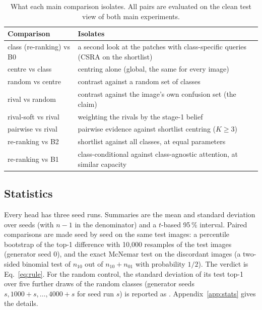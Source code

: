 \documentclass[11pt,a4paper]{article}
\theoremstyle{plain}
\newcommand{\fn}[1]{\texttt{\detokenize{#1}}}
\begin{document}
\begin{table}[!htbp]
\centering
\caption{What each main comparison isolates. All pairs are evaluated on the clean test view of both main
experiments.}
\label{tab:isolates}
\small
\begin{tabularx}{\textwidth}{@{}L{4.6cm}Y@{}}
\toprule
Comparison & Isolates\\
\midrule
class (re-ranking) vs B0 & a second look at the patches with class-specific queries (CSRA on the shortlist)\\
centre vs class & centring alone (global, the same for every image)\\
random vs centre & contrast against a random set of classes\\
rival vs random & contrast against the image's own confusion set (the claim)\\
rival-soft vs rival & weighting the rivals by the stage-1 belief\\
pairwise vs rival & pairwise evidence against shortlist centring ($K\ge3$)\\
re-ranking vs B2 & shortlist against all classes, at equal parameters\\
re-ranking vs B1 & class-conditional against class-agnostic attention, at similar capacity\\
\bottomrule
\end{tabularx}
\end{table}

\subsection{Statistics}\label{sec:stats}
Every head has three seed runs. Summaries are the mean and standard deviation over seeds (with $n-1$ in the
denominator) and a $t$-based 95\,\% interval. Paired comparisons are made seed by seed on the same test images: a
percentile bootstrap of the top-1 difference with 10,000 resamples of the test images (generator seed 0), and the
exact McNemar test on the discordant images (a two-sided binomial test of $n_{10}$ out of $n_{10}+n_{01}$ with
probability $1/2$). The verdict is Eq.~\eqref{eq:rule}. For the random control, the standard deviation of its test
top-1 over five further draws of the random classes (generator seeds $s,1000+s,\dots,4000+s$ for seed run $s$) is
reported as \fn{top1_draw_sd}. Appendix~\ref{app:stats} gives the details.
\end{document}
